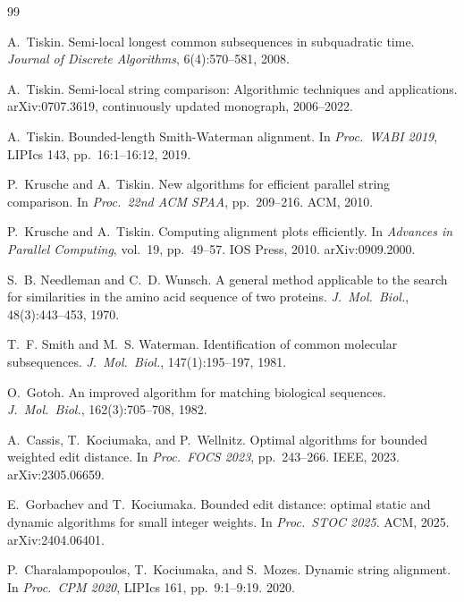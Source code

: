 \documentclass[11pt, a4paper]{article}
\theoremstyle{definition}
\theoremstyle{remark}
\begin{document}
\begin{thebibliography}{99}

A.~Tiskin.
\newblock Semi-local longest common subsequences in subquadratic time.
\newblock \emph{Journal of Discrete Algorithms}, 6(4):570--581, 2008.

A.~Tiskin.
\newblock Semi-local string comparison: Algorithmic techniques and
  applications.
\newblock arXiv:0707.3619, continuously updated monograph, 2006--2022.

A.~Tiskin.
\newblock Bounded-length {S}mith-{W}aterman alignment.
\newblock In \emph{Proc.\ WABI 2019}, LIPIcs 143, pp.~16:1--16:12, 2019.

P.~Krusche and A.~Tiskin.
\newblock New algorithms for efficient parallel string comparison.
\newblock In \emph{Proc.\ 22nd ACM SPAA}, pp.~209--216. ACM, 2010.

P.~Krusche and A.~Tiskin.
\newblock Computing alignment plots efficiently.
\newblock In \emph{Advances in Parallel Computing}, vol.~19, pp.~49--57.
  IOS Press, 2010. arXiv:0909.2000.

S.~B. Needleman and C.~D. Wunsch.
\newblock A general method applicable to the search for similarities
  in the amino acid sequence of two proteins.
\newblock \emph{J.\ Mol.\ Biol.}, 48(3):443--453, 1970.

T.~F. Smith and M.~S. Waterman.
\newblock Identification of common molecular subsequences.
\newblock \emph{J.\ Mol.\ Biol.}, 147(1):195--197, 1981.

O.~Gotoh.
\newblock An improved algorithm for matching biological sequences.
\newblock \emph{J.\ Mol.\ Biol.}, 162(3):705--708, 1982.

A.~Cassis, T.~Kociumaka, and P.~Wellnitz.
\newblock Optimal algorithms for bounded weighted edit distance.
\newblock In \emph{Proc.\ FOCS 2023}, pp.~243--266. IEEE, 2023.
  arXiv:2305.06659.

E.~Gorbachev and T.~Kociumaka.
\newblock Bounded edit distance: optimal static and dynamic algorithms
  for small integer weights.
\newblock In \emph{Proc.\ STOC 2025}. ACM, 2025.
  arXiv:2404.06401.

P.~Charalampopoulos, T.~Kociumaka, and S.~Mozes.
\newblock Dynamic string alignment.
\newblock In \emph{Proc.\ CPM 2020}, LIPIcs 161, pp.~9:1--9:19. 2020.


\end{thebibliography}
\end{document}
